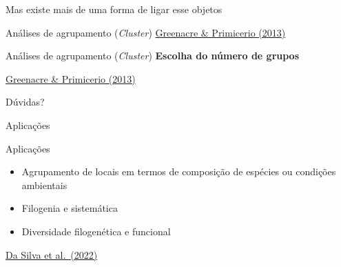 \documentclass[
  ignorenonframetext,
]{beamer}
\begin{document}
\begin{frame}{Mas existe mais de uma forma de ligar esse objetos}
\begin{block}{Análises de agrupamento (\emph{Cluster})}
\href{https://www.fbbva.es/microsite/multivariate-statistics/}{Greenacre
\& Primicerio (2013)}
\end{block}

\begin{block}{Análises de agrupamento (\emph{Cluster})}
\protect\hypertarget{anuxe1lises-de-agrupamento-cluster-15}{}
\textbf{Escolha do número de grupos}

\href{https://www.fbbva.es/microsite/multivariate-statistics/}{Greenacre
\& Primicerio (2013)}
\end{block}
\end{frame}

\begin{frame}{Dúvidas?}
\protect\hypertarget{duxfavidas-1}{}
\end{frame}

\begin{frame}{Aplicações}
\protect\hypertarget{aplicauxe7uxf5es-1}{}
\begin{block}{Aplicações}
\protect\hypertarget{aplicauxe7uxf5es-2}{}
\begin{itemize}
\item
  Agrupamento de locais em termos de composição de espécies ou condições
  ambientais
\item
  Filogenia e sistemática
\item
  Diversidade filogenética e funcional
\end{itemize}

\href{https://analises-ecologicas.com/}{Da Silva et al.~(2022)}
\end{block}
\end{frame}
\end{document}
